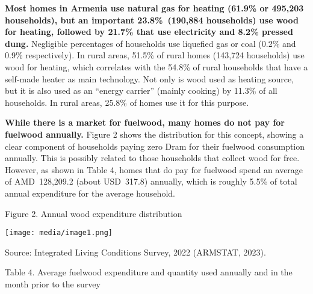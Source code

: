 \documentclass[
  letterpaper,
  DIV=11,
  numbers=noendperiod]{scrartcl}
\begin{document}
\textbf{Most homes in Armenia use natural gas for heating (61.9\% or
495,203 households), but an important 23.8\%~(190,884 households) use
wood for heating, followed by 21.7\% that use electricity and 8.2\%
pressed dung.} Negligible percentages of households use liquefied gas or
coal (0.2\% and 0.9\% respectively). In rural areas, 51.5\% of rural
homes (143,724 households) use wood for heating, which correlates with
the 54.8\% of rural households that have a self-made heater as main
technology. Not only is wood used as heating source, but it is also used
as an ``energy carrier'' (mainly cooking) by 11.3\% of all households.
In rural areas, 25.8\% of homes use it for this purpose.

\textbf{While there is a market for fuelwood, many homes do not pay for
fuelwood annually.} Figure 2 shows the distribution for this concept,
showing a clear component of households paying zero Dram for their
fuelwood consumption annually. This is possibly related to those
households that collect wood for free. However, as shown in Table 4,
homes that do pay for fuelwood spend an average of AMD~128,209.2 (about
USD~317.8) annually, which is roughly 5.5\% of total annual expenditure
for the average household.

\label{_Ref154834559}{}Figure 2. Annual wood expenditure
distribution

\texttt{[image: media/image1.png]}

Source: Integrated Living Conditions Survey, 2022 (ARMSTAT, 2023).

\label{_Ref154909808}{}Table 4. Average fuelwood
expenditure and quantity used annually and in the month prior to the
survey
\end{document}
